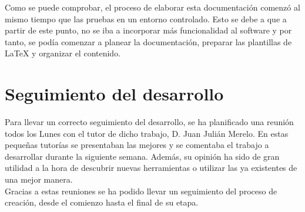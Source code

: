 Como se puede comprobar, el proceso de elaborar esta documentación comenzó al mismo tiempo que las pruebas en un entorno controlado. Esto se debe a que a partir de este punto, 
no se iba a incorporar más funcionalidad al software y por tanto, se podía comenzar a planear la documentación, preparar las plantillas de LaTeX y organizar el contenido.

\section{Seguimiento del desarrollo}
Para llevar un correcto seguimiento del desarrollo, se ha planificado una reunión todos los Lunes con el tutor de dicho trabajo, D. Juan Julián Merelo. En estas pequeñas 
tutorías se presentaban las mejores y se comentaba el trabajo a desarrollar durante la siguiente semana. Además, su opinión ha sido de gran utilidad a la hora de descubrir
nuevas herramientas o utilizar las ya existentes de una mejor manera.\\

Gracias a estas reuniones se ha podido llevar un seguimiento del proceso de creación, desde el comienzo hasta el final de su etapa.
